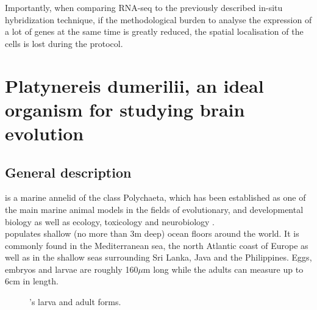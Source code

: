     Importantly, when comparing RNA-seq to the previously described in-situ hybridization technique, if the methodological burden to analyse the expression of a lot of genes at the same time is greatly reduced, the spatial localisation of the cells is lost during the protocol.\\
    
    
\section{Platynereis dumerilii, an ideal organism for studying brain evolution}\label{sec:platynereis}
     \subsection{General description}
     \platyfull{} is a marine annelid of the class Polychaeta, which has been established as one of the main marine animal models in the fields of evolutionary, and developmental biology as well as ecology, toxicology and neurobiology \cite{hutchinson95,tessmar03,hardege99,dorresteijn90,fischer04,Fischer10}.\\
     
     \platy{} populates shallow (no more than 3m deep) ocean floors around the world. It is commonly found in the Mediterranean sea, the north Atlantic coast of Europe as well as in the shallow seas surrounding Sri Lanka, Java and the Philippines. Eggs, embryos and larvae are roughly 160$\mu$m long while the adults can measure up to 6cm in length.
     
     
\begin{figure}[bth]
        \myfloatalign
         \quad
        \caption{\platyfull{}'s larva and adult forms.}\label{fig:platynereis}
\end{figure}
     
